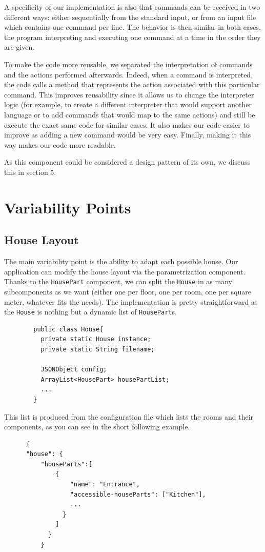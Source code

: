 		A specificity of our implementation is also that commands can be received in two different ways: either sequentially from the standard input, or from an input file which contains one command per line. The behavior is then similar in both cases, the program interpreting and executing one command at a time in the order they are given.
		
		To make the code more reusable, we separated the interpretation of commands and the actions performed afterwards. Indeed, when a command is interpreted, the code calls a method that represents the action associated with this particular command. This improves reusability since it allows us to change the interpreter logic (for example, to create a different interpreter that would support another language or to add commands that would map to the same actions) and still be execute the exact same code for similar cases. It also makes our code easier to improve as adding a new command would be very easy. Finally, making it this way makes our code more readable.
		
		As this component could be considered a design pattern of its own, we discuss this in section 5.

  \section{Variability Points}
    \subsection{House Layout}
      The main variability point is the ability to adapt each possible house. Our application can modify the house layout via the parametrization component. Thanks to the \texttt{HousePart} component, we can split the \texttt{House} in as many subcomponents as we want (either one per floor, one per room, one per square meter, whatever fits the needs). The implementation is pretty straightforward as the \texttt{House} is nothing but a dynamic list of \texttt{HousePart}s.
      \begin{verbatim}
        public class House{
          private static House instance;
          private static String filename;

          JSONObject config;
          ArrayList<HousePart> housePartList;
          ...
        }
      \end{verbatim}
      This list is produced from the configuration file which lists the rooms and their components, as you can see in the short following example.
      \begin{verbatim}
      {
      "house": {
          "houseParts":[
              {
                  "name": "Entrance",
                  "accessible-houseParts": ["Kitchen"],
                  ...
                }
              ]
            }
          }
      \end{verbatim}

